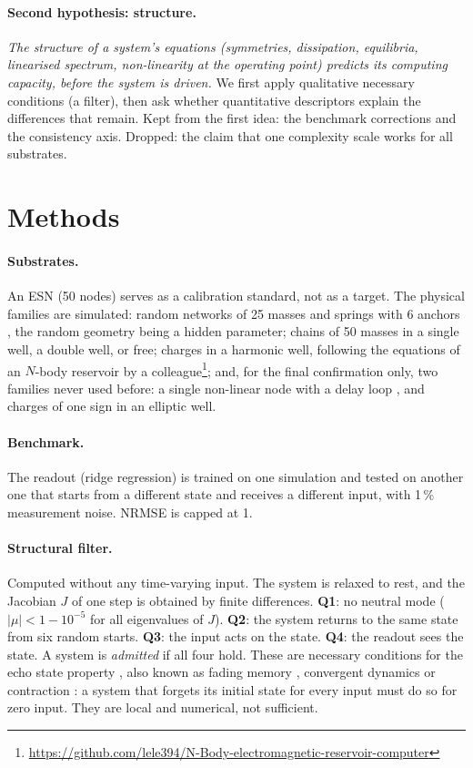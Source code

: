 \documentclass[10pt,a4paper]{article}
\begin{document}
\paragraph{Second hypothesis: structure.} \emph{The structure of a system's equations
(symmetries, dissipation, equilibria, linearised spectrum, non-linearity at the operating
point) predicts its computing capacity, before the system is driven.} We first apply
qualitative necessary conditions (a filter), then ask whether quantitative descriptors explain
the differences that remain. Kept from the first idea: the benchmark corrections and the
consistency axis. Dropped: the claim that one complexity scale works for all substrates.

\section{Methods}

\paragraph{Substrates.} An ESN (50 nodes) serves as a calibration standard, not as a target.
The physical families are simulated: random networks of 25 masses and springs with 6 anchors
\cite{hauser2011}, the random geometry being a hidden parameter; chains of 50 masses in a
single well, a double well, or free; charges in a harmonic well, following the equations of
an $N$-body reservoir by a colleague\footnote{\url{https://github.com/lele394/N-Body-electromagnetic-reservoir-computer}};
and, for the final confirmation only, two families never used before: a single non-linear
node with a delay loop \cite{appeltant2011}, and charges of one sign in an elliptic well.

\paragraph{Benchmark.} The readout (ridge regression) is trained on one simulation and tested
on another one that starts from a different state and receives a different input, with 1\,\%
measurement noise. NRMSE is capped at 1.

\paragraph{Structural filter.} Computed without any time-varying input. The system is relaxed
to rest, and the Jacobian $J$ of one step is obtained by finite differences.
\textbf{Q1}: no neutral mode ($|\mu| < 1 - 10^{-5}$ for all eigenvalues of $J$).
\textbf{Q2}: the system returns to the same state from six random starts.
\textbf{Q3}: the input acts on the state. \textbf{Q4}: the readout sees the state.
A system is \emph{admitted} if all four hold. These are necessary conditions for the echo
state property \cite{jaeger2001}, also known as fading memory \cite{boydchua1985}, convergent
dynamics \cite{pavlov2004} or contraction \cite{lohmiller1998}: a system that forgets its
initial state for every input must do so for zero input. They are local and numerical, not
sufficient.
\end{document}
